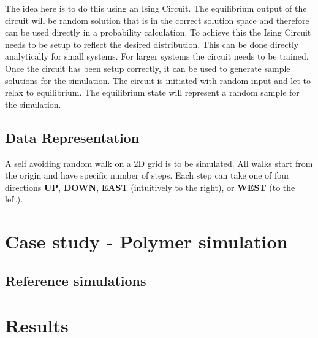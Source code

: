 \documentclass[11pt]{article}
\begin{document}
The idea here is to do this using an Ising Circuit. The equilibrium output of the circuit will be random solution that is in the correct solution space and therefore can be used directly in a probability calculation. To achieve this the Ising Circuit needs to be setup to reflect the desired distribution. This can be done directly analytically for small systems. For larger systems the circuit needs to be trained. Once the circuit has been setup correctly, it can be used to generate sample solutions for the simulation. The circuit is initiated with random input and let to relax to equilibrium. The equilibrium state will represent a random sample for the simulation.

\subsection{Data Representation}
A self avoiding random walk on a 2D grid is to be simulated. All walks start from the origin and have specific number of steps. Each step can take one of four directions \textbf{UP}, \textbf{DOWN}, \textbf{EAST} (intuitively to the right),  or \textbf{WEST} (to the left).
\section{Case study - Polymer simulation}
\subsection{Reference simulations}


\section{Results}


\end{document}
